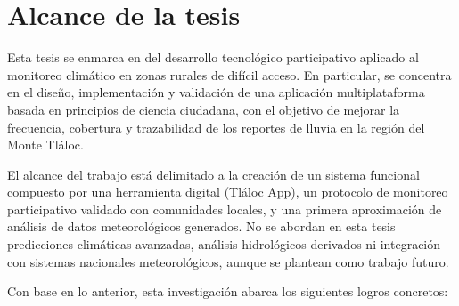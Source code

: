 
\section{Alcance de la tesis}

Esta tesis se enmarca en del desarrollo tecnológico participativo aplicado al monitoreo climático en zonas rurales de difícil acceso. En particular, se concentra en el diseño, implementación y validación de una aplicación multiplataforma basada en principios de ciencia ciudadana, con el objetivo de mejorar la frecuencia, cobertura y trazabilidad de los reportes de lluvia en la región del Monte Tláloc.

El alcance del trabajo está delimitado a la creación de un sistema funcional compuesto por una herramienta digital (Tláloc App), un protocolo de monitoreo participativo validado con comunidades locales, y una primera aproximación de análisis de datos meteorológicos generados. No se abordan en esta tesis predicciones climáticas avanzadas, análisis hidrológicos derivados ni integración con sistemas nacionales meteorológicos, aunque se plantean como trabajo futuro.

Con base en lo anterior, esta investigación abarca los siguientes logros concretos:

